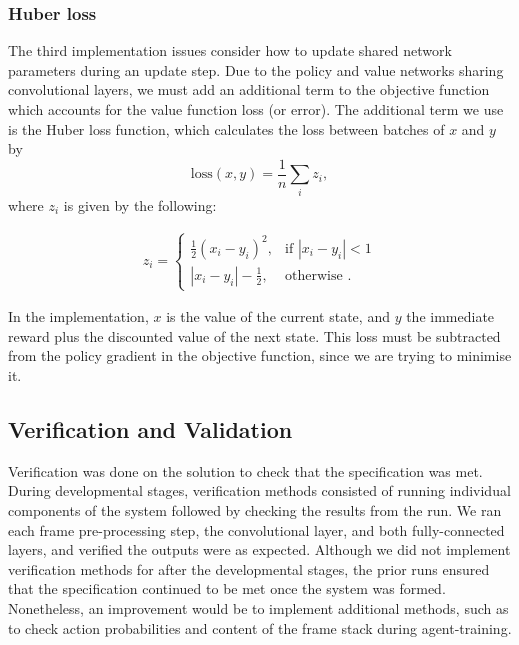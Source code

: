 \documentclass[12pt,a4paper]{article}
\begin{document}
\subsubsection{Huber loss}
The third implementation issues consider how to update shared network parameters during an update step. Due to the policy and value networks sharing convolutional layers, we must add an additional term to the objective function which accounts for the value function loss (or error). The additional term we use is the Huber loss function, which calculates the loss between batches of $x$ and $y$ by $$\text{loss}(x, y) = \frac{1}{n} \sum_{i} z_{i},$$ where $z_i$ is given by the following:

\[\begin{aligned}
z_{i} =
\begin{cases}
\frac{1}{2} (x_i - y_i)^2, & \text{if } |x_i - y_i| < 1 \\
|x_i - y_i| - \frac{1}{2}, & \text{otherwise }.
\end{cases}
\end{aligned}\]

In the implementation, $x$ is the value of the current state, and $y$ the immediate reward plus the discounted value of the next state. This loss must be subtracted from the policy gradient in the objective function, since we are trying to minimise it.

\subsection{Verification and Validation}
Verification was done on the solution to check that the specification was met. During developmental stages, verification methods consisted of running individual components of the system followed by checking the results from the run. We ran each frame pre-processing step, the convolutional layer, and both fully-connected layers, and verified the outputs were as expected. Although we did not implement verification methods for after the developmental stages, the prior runs ensured that the specification continued to be met once the system was formed. Nonetheless, an improvement would be to implement additional methods, such as to check action probabilities and content of the frame stack during agent-training.

\end{document}
